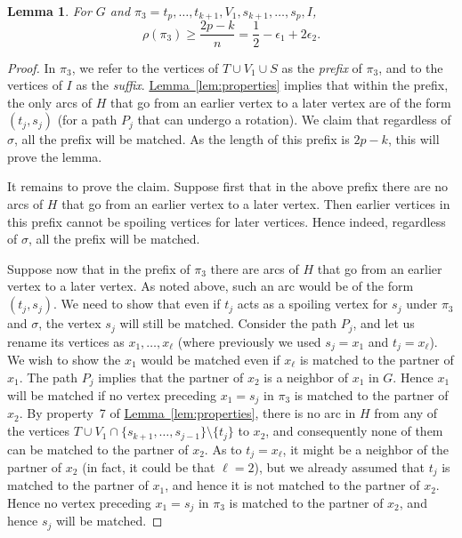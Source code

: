 \documentclass[11pt]{article}
\numberwithin{equation}{section}
\newtheorem{lemma}[theorem]{Lemma}
\theoremstyle{definition}
\theoremstyle{plain}
\newcommand{\expref}[2]{\hyperref[#2]{#1~\ref{#2}}}
\theoremstyle{plain}
\begin{document}
\begin{lemma}
	\label{lem:sort1}
For $G$ and $\pi_3 = t_p, \ldots, t_{k+1}, V_1, s_{k+1}, \ldots, s_p, I$,
$$\rho(\pi_3) \ge \frac{2p - k}{n} = \frac{1}{2} - \epsilon_1 + 2\epsilon_2.$$
\end{lemma}

\begin{proof}
	In $\pi_3$, we refer to the vertices of $T \cup V_1 \cup S$ as the \emph{prefix} of $\pi_3$, and to the vertices of $I$ as the \emph{suffix}. \expref{Lemma}{lem:properties} implies that within the prefix, the only arcs of $H$ that go from an earlier vertex to a later vertex are of the form $(t_j,s_j)$ (for a path $P_j$ that can undergo a rotation). We claim that regardless of $\sigma$, all the prefix will be matched. As the length of this prefix is $2p - k$, this will prove the lemma.
	
	It remains to prove the claim. Suppose first that in the above prefix there are no arcs of $H$ that go from an earlier vertex to a later vertex. Then earlier vertices
	in this prefix cannot be spoiling vertices for later vertices. Hence indeed,
	regardless of $\sigma$, all the prefix will be matched.
	
	Suppose now that in the prefix of $\pi_3$ there are arcs of $H$ that go from an earlier vertex to a later vertex. As noted above, such an arc would be of the form $(t_j,s_j)$. We need to show that even if $t_j$ acts as a spoiling vertex for $s_j$ under $\pi_3$ and $\sigma$, the vertex $s_j$ will still be matched. Consider the path $P_j$, and let us rename its vertices as $x_1, \ldots, x_{\ell}$ (where previously we used $s_j = x_1$ and $t_j = x_{\ell}$). We wish to show the $x_1$ would be matched even if $x_{\ell}$ is matched to the partner of $x_1$. The path $P_j$ implies that the partner of $x_2$ is a neighbor of $x_1$ in $G$. Hence $x_1$ will be matched if no vertex preceding $x_1 = s_j$ in $\pi_3$ is matched to the partner of $x_2$. By property~7 of \expref{Lemma}{lem:properties}, there is no arc in $H$ from any of the vertices $T \cup V_1 \cap \{s_{k+1}, \ldots, s_{j-1}\} \setminus \{t_j\}$ to $x_2$, and consequently none of them can be matched to the partner of $x_2$. As to $t_j = x_{\ell}$, it might be a neighbor of the partner of $x_2$ (in fact, it could be that $\ell = 2$), but we already assumed that $t_j$ is matched to the partner of $x_1$, and hence it is not matched to the partner of $x_2$. Hence no vertex preceding $x_1 = s_j$ in $\pi_3$ is matched to the partner of $x_2$, and hence $s_j$ will be matched.
\end{proof}
\end{document}
